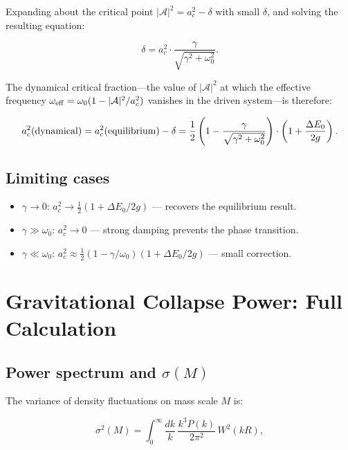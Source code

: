 \documentclass[aps,prd,onecolumn]{revtex4-2}
\begin{document}
Expanding about the critical point $|\mathcal{A}|^2 = a_c^2 - \delta$ with small $\delta$, and solving the resulting equation:

\begin{equation}
\delta = a_c^2 \cdot \frac{\gamma}{\sqrt{\gamma^2 + \omega_0^2}}.
\end{equation}

The dynamical critical fraction---the value of $|\mathcal{A}|^2$ at which the effective frequency $\omega_{\rm eff} = \omega_0(1 - |\mathcal{A}|^2/a_c^2)$ vanishes in the driven system---is therefore:

\begin{equation}
a_c^2({\rm dynamical}) = a_c^2({\rm equilibrium}) - \delta = \frac{1}{2}\left(1 - \frac{\gamma}{\sqrt{\gamma^2 + \omega_0^2}}\right) \cdot \left(1 + \frac{\Delta E_0}{2g}\right).
\end{equation}

\subsection{Limiting cases}

\begin{itemize}
\item $\gamma \to 0$: $a_c^2 \to \frac{1}{2}(1 + \Delta E_0/2g)$ --- recovers the equilibrium result.
\item $\gamma \gg \omega_0$: $a_c^2 \to 0$ --- strong damping prevents the phase transition.
\item $\gamma \ll \omega_0$: $a_c^2 \approx \frac{1}{2}(1 - \gamma/\omega_0)(1 + \Delta E_0/2g)$ --- small correction.
\end{itemize}

\section{Gravitational Collapse Power: Full Calculation}

\subsection{Power spectrum and $\sigma(M)$}

The variance of density fluctuations on mass scale $M$ is:

\begin{equation}
\sigma^2(M) = \int_0^\infty \frac{dk}{k} \, \frac{k^3 P(k)}{2\pi^2} \, W^2(kR),
\end{equation}
\end{document}

